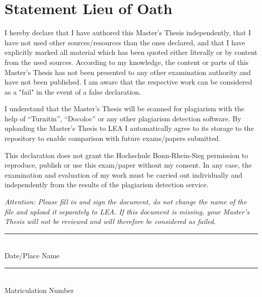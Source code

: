 \section*{\centering Statement Lieu of Oath}
\flushleft
I hereby declare that I have authored this Master’s Thesis independently, that I have not used other sources/resources than the ones declared, and that I have explicitly marked all material which has been quoted either literally or by content from the used sources. According to my knowledge, the content or parts of this Master’s Thesis has not been presented to any other examination authority and have not been published. I am aware that the respective work can be considered as a "fail" in the event of a false declaration.

\vspace*{12pt}
I understand that the Master’s Thesis will be scanned for plagiarism with the help of “Turnitin”, “Docoloc” or any other plagiarism detection software. By uploading the Master’s Thesis to LEA I automatically agree to its storage to the repository to enable comparison with future exams/papers submitted.

\vspace*{12pt}
This declaration does not grant the Hochschule Bonn-Rhein-Sieg permission to reproduce, publish or use this exam/paper without my consent. In any case, the examination and evaluation of my work must be carried out individually and independently from the results of the plagiarism detection service.

\vspace*{12pt}
\textit{Attention: Please fill in and sign the document, do not change the name of the file and upload it separately to LEA.  If this document is missing, your Master’s Thesis will not be reviewed and will therefore be considered as failed.}


\vspace*{4cm}
\rule{\textwidth}{0.4pt}\\

\quad Date/Place	\hspace{6cm}   Name



\vspace*{3cm}

\rule{7cm}{0.4pt}\\
\quad Matriculation Number

